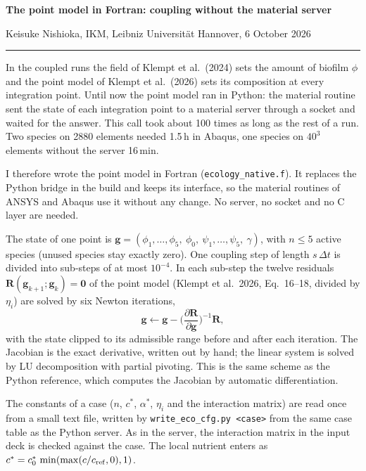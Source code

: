 \documentclass[11pt,a4paper]{article}
\newcommand{\sect}[1]{\par\vspace{6pt}{\color{c3}\large\bfseries #1}\par\vspace{2pt}}
\newcommand{\file}[1]{\texttt{\small #1}}
\begin{document}
\sloppy
{\Large\bfseries The point model in Fortran: coupling without the material server}\par
\vspace{3pt}
Keisuke Nishioka, IKM, Leibniz Universit\"at Hannover, 6 October 2026\par
\vspace{2pt}\hrule

\sect{Why}
In the coupled runs the field of Klempt et al.\ (2024) sets the amount of
biofilm $\phi$ and the point model of Klempt et al.\ (2026) sets its
composition at every integration point. Until now the point model ran in
Python: the material routine sent the state of each integration point to a
material server through a socket and waited for the answer. This call took
about 100 times as long as the rest of a run. Two species on 2880 elements
needed 1.5\,h in Abaqus, one species on $40^3$ elements without the server
16\,min.

I therefore wrote the point model in Fortran (\file{ecology\_native.f}). It
replaces the Python bridge in the build and keeps its interface, so the material
routines of ANSYS and Abaqus use it without any change. No server, no socket
and no C layer are needed.

\sect{What it computes}
The state of one point is
$\mathbf g=(\phi_1,\dots,\phi_5,\ \phi_0,\ \psi_1,\dots,\psi_5,\ \gamma)$, with
$n\le5$ active species (unused species stay exactly zero). One coupling step of
length $s\,\Delta t$ is divided into sub-steps of at most $10^{-4}$. In each
sub-step the twelve residuals $\mathbf R(\mathbf g_{k+1};\mathbf g_k)=\mathbf 0$
of the point model (Klempt et al.\ 2026, Eq.~16--18, divided by $\eta_i$) are
solved by six Newton iterations,
\[
  \mathbf g \leftarrow \mathbf g-\Big(\frac{\partial\mathbf R}{\partial\mathbf g}\Big)^{-1}\mathbf R ,
\]
with the state clipped to its admissible range before and after each iteration.
The Jacobian is the exact derivative, written out by hand; the linear system is
solved by LU decomposition with partial pivoting. This is the same scheme as the
Python reference, which computes the Jacobian by automatic differentiation.

The constants of a case ($n$, $c^*$, $\alpha^*$, $\eta_i$ and the interaction
matrix) are read once from a small text file, written by
\file{write\_eco\_cfg.py <case>} from the same case table as the Python server.
As in the server, the interaction matrix in the input deck is checked against
the case. The local nutrient enters as $c^*=c^*_0\,\min(\max(c/c_{\rm ref},0),1)$.
\end{document}
